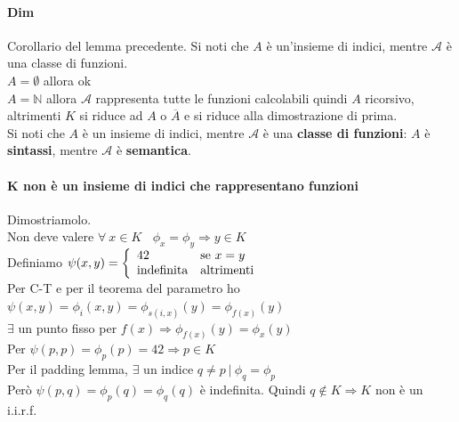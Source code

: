 \documentclass[10pt]{book}
\begin{document}
\paragraph{Dim} Corollario del lemma precedente. Si noti che $A$ è un'insieme di indici, mentre $\mathscr{A}$ è una classe di funzioni.\\
$A = \emptyset$ allora ok\\
$A = \mathbb{N}$ allora $\mathscr{A}$ rappresenta tutte le funzioni calcolabili quindi $A$ ricorsivo, altrimenti $K$ si riduce ad $A$ o $\overline{A}$ e si riduce alla dimostrazione di prima.\\
Si noti che $A$ è un insieme di indici, mentre $\mathscr{A}$ è una \textbf{classe di funzioni}: $A$ è \textbf{sintassi}, mentre $\mathscr{A}$ è \textbf{semantica}.
\paragraph{K non è un insieme di indici che rappresentano funzioni} Dimostriamolo.\\ Non deve valere $\forall\:x\in K\:\:\:\:\phi_x = \phi_y \Rightarrow y \in K$\\
Definiamo $\psi(x, y) = \left\{\begin{array}{l l}
	42 & \text{se }x = y\\
	\text{indefinita} & \text{altrimenti}
\end{array} \right.$\\Per C-T e per il teorema del parametro ho $\psi(x, y) = \phi_i(x, y) = \phi_{s(i,x)}(y) = \phi_{f(x)}(y)$\\
$\exists$ un punto fisso per $f(x) \Rightarrow \phi_{f(x)}(y) = \phi_x(y)$\\
Per $\psi(p,p) = \phi_p(p) = 42 \Rightarrow p\in K$\\
Per il padding lemma, $\exists$ un indice $q \neq p\:|\:\phi_q = \phi_p$\\
Però $\psi(p,q) = \phi_p(q) = \phi_q(q)$ è indefinita. Quindi $q\not\in K \Rightarrow K$ non è un i.i.r.f.
\end{document}
